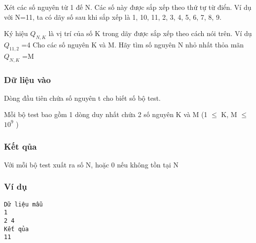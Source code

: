 

Xét các số nguyên từ 1 đế N. Các số này được sắp xếp theo thứ tự từ điển. Ví dụ với N=11, ta có dãy số sau khi sắp xếp là 1, 10, 11, 2, 3, 4, 5, 6, 7, 8, 9.

Ký hiệu $Q_{N,K}$ là vị trí của số K trong dãy được sắp xếp theo cách nói trên. Ví dụ $Q_{11,2}$ =4 Cho các số nguyên K và M. Hãy tìm số nguyên N nhỏ nhất thỏa mãn $Q_{N,K}$ =M

\subsubsection{Dữ liệu vào}

Dòng đầu tiên chứa số nguyên t cho biết số bộ test.

Mỗi bộ test bao gồm 1 dòng duy nhất chứa 2 số nguyên K và M (1  $\le$  K, M  $\le$  $10^{9}$ )

\subsubsection{Kết qủa}

Với mỗi bộ test xuất ra số N, hoặc 0 nếu không tồn tại N

\subsubsection{Ví dụ}
\begin{verbatim}
Dữ liệu mẫu
1
2 4
Kết qủa
11
\end{verbatim}
